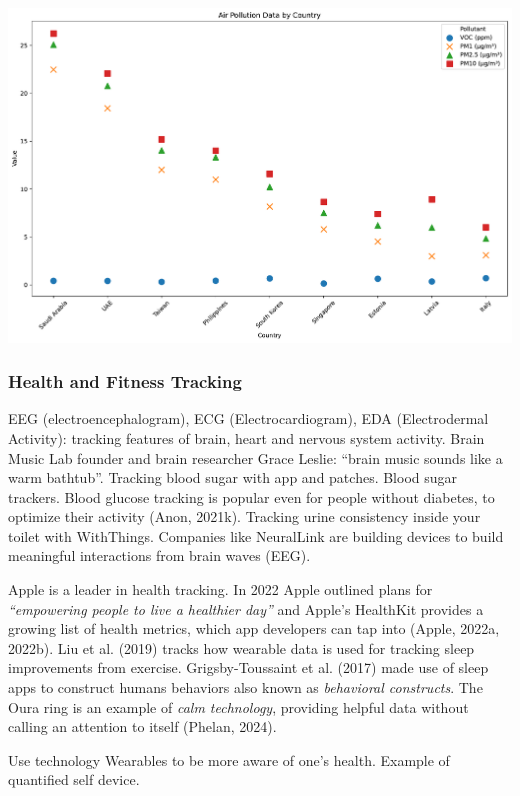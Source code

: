 \documentclass[
  letterpaper,
  DIV=11,
  numbers=noendperiod]{scrartcl}
\begin{document}
\includegraphics{_thesis_files/figure-pdf/cell-23-output-1.pdf}

\subsubsection{\texorpdfstring{\textbf{Health and Fitness
Tracking}}{Health and Fitness Tracking}}\label{health-and-fitness-tracking}

EEG (electroencephalogram), ECG (Electrocardiogram), EDA (Electrodermal
Activity): tracking features of brain, heart and nervous system
activity. Brain Music Lab founder and brain researcher Grace Leslie:
``brain music sounds like a warm bathtub''. Tracking blood sugar with
app and patches. Blood sugar trackers. Blood glucose tracking is popular
even for people without diabetes, to optimize their activity (Anon,
2021k). Tracking urine consistency inside your toilet with WithThings.
Companies like NeuralLink are building devices to build meaningful
interactions from brain waves (EEG).

Apple is a leader in health tracking. In 2022 Apple outlined plans for
\emph{``empowering people to live a healthier day''} and Apple's
HealthKit provides a growing list of health metrics, which app
developers can tap into (Apple, 2022a, 2022b). Liu et al. (2019) tracks
how wearable data is used for tracking sleep improvements from exercise.
Grigsby-Toussaint et al. (2017) made use of sleep apps to construct
humans behaviors also known as \emph{behavioral constructs}. The Oura
ring is an example of \emph{calm technology}, providing helpful data
without calling an attention to itself (Phelan, 2024).

Use technology Wearables to be more aware of one's health. Example of
quantified self device.
\end{document}
